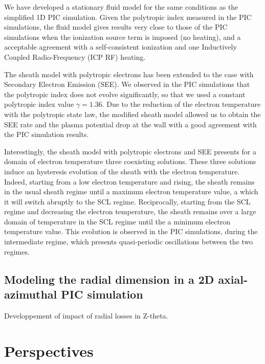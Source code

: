 We have developed a stationary fluid model for the same conditions as the simplified 1D PIC simulation.
Given the polytropic index measured in the PIC simulations, the fluid model gives results very close to those of the PIC simulations when the ionization source term is imposed (no heating), and a acceptable agreement with a self-consistent ionization and one Inductively Coupled Radio-Frequency (ICP RF) heating.

\vspace{1ex}
The sheath model with polytropic electrons has been extended to the case with Secondary Electron Emission (SEE).
We observed in the PIC simulations that the polytropic index does not evolve significantly, so that we used a constant polytropic index value $\gamma=1.36$.
Due to the reduction of the electron temperature with the polytropic state law, the modified sheath model allowed us to obtain the SEE rate and the plasma potential drop at the wall with a good agreement with the PIC simulation results.

Interestingly, the sheath model with polytropic electrons and SEE presents for a domain of electron temperature three coexisting solutions.
These three solutions induce an hysteresis evolution of the sheath with the electron temperature.
Indeed, starting from a low electron temperature and rising, the sheath remains in the usual sheath regime until a maximum electron temperature value, a which it will switch abruptly to the SCL regime.
Reciprocally, starting from the SCL regime and decreasing the electron temperature, the sheath remains over a large domain of temperature in the SCL regime until the a minimum electron temperature value.
This evolution is observed in the PIC simulations, during the intermediate regime, which presents quasi-periodic oscillations between the two regimes. 


\subsection{Modeling the radial dimension in a 2D axial-azimuthal PIC simulation}

Developpement of impact of radial losses in Z-theta.




\section{Perspectives}

